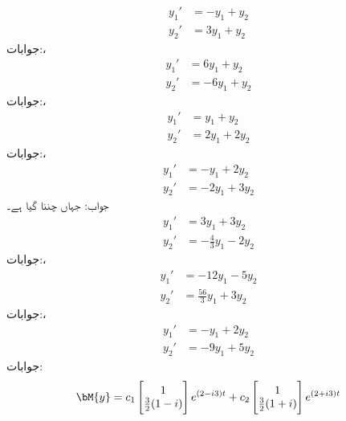 \begin{align*}
y_1'&=-y_1+y_2\\
y_2'&=3y_1+y_2
\end{align*}
جوابات:، 
\begin{align*}
y_1'&=6y_1+y_2\\
y_2'&=-6y_1+y_2
\end{align*}
جوابات:، 
\begin{align*}
y_1'&=y_1+y_2\\
y_2'&=2y_1+2y_2
\end{align*}
جوابات:، 
\begin{align*}
y_1'&=-y_1+2y_2\\
y_2'&=-2y_1+3y_2
\end{align*}
جواب: جہاں  چننا گیا ہے۔
\begin{align*}
y_1'&=3y_1+3y_2\\
y_2'&=-\frac{4}{3}y_1-2y_2
\end{align*}
جوابات:، 
\begin{align*}
y_1'&=-12y_1-5y_2\\
y_2'&=\frac{56}{3}y_1+3y_2
\end{align*}
جوابات:، 
\begin{align*}
y_1'&=-y_1+2y_2\\
y_2'&=-9y_1+5y_2
\end{align*}
جوابات:
\begin{align*}
\bM{y}=c_1\begin{bmatrix} 1 \\ \tfrac{3}{2}(1-i) \end{bmatrix} e^{(2-i3)t}+c_2\begin{bmatrix} 1\\ \tfrac{3}{2}(1+i) \end{bmatrix} e^{(2+i3)t}
\end{align*}

